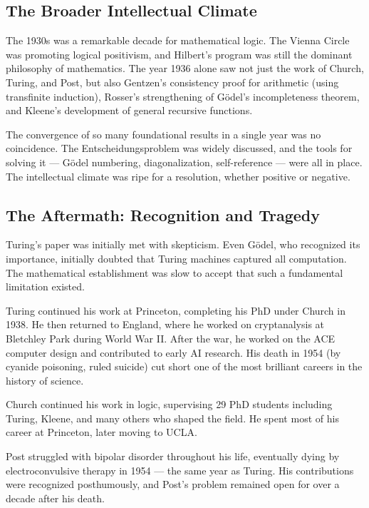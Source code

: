 \subsection*{The Broader Intellectual Climate}

The 1930s was a remarkable decade for mathematical logic. The Vienna Circle was promoting logical positivism, and Hilbert's program was still the dominant philosophy of mathematics. The year 1936 alone saw not just the work of Church, Turing, and Post, but also Gentzen's consistency proof for arithmetic (using transfinite induction), Rosser's strengthening of G\"odel's incompleteness theorem, and Kleene's development of general recursive functions.

The convergence of so many foundational results in a single year was no coincidence. The Entscheidungsproblem was widely discussed, and the tools for solving it — G\"odel numbering, diagonalization, self-reference — were all in place. The intellectual climate was ripe for a resolution, whether positive or negative.

\subsection*{The Aftermath: Recognition and Tragedy}

Turing's paper was initially met with skepticism. Even G\"odel, who recognized its importance, initially doubted that Turing machines captured all computation. The mathematical establishment was slow to accept that such a fundamental limitation existed.

Turing continued his work at Princeton, completing his PhD under Church in 1938. He then returned to England, where he worked on cryptanalysis at Bletchley Park during World War II. After the war, he worked on the ACE computer design and contributed to early AI research. His death in 1954 (by cyanide poisoning, ruled suicide) cut short one of the most brilliant careers in the history of science.

Church continued his work in logic, supervising 29 PhD students including Turing, Kleene, and many others who shaped the field. He spent most of his career at Princeton, later moving to UCLA.

Post struggled with bipolar disorder throughout his life, eventually dying by electroconvulsive therapy in 1954 — the same year as Turing. His contributions were recognized posthumously, and Post's problem remained open for over a decade after his death.

